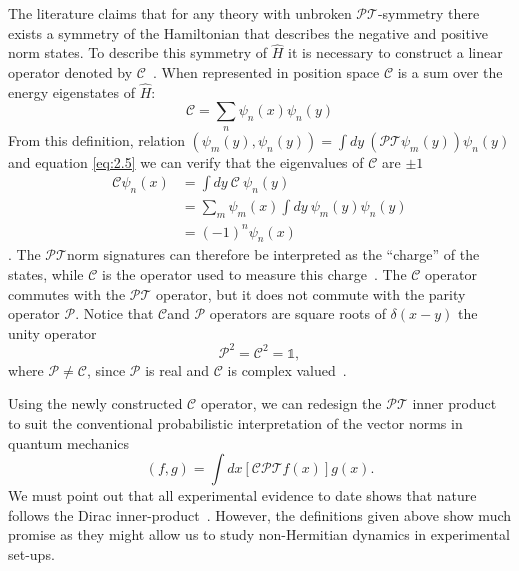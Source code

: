 \documentclass[12pt, a4paper]{report}
\newcommand\PT{\(\mathcal{PT}\)}
\newcommand\PP{\(\mathcal{P}\)}
\newcommand\CC{\(\mathcal{C}\)}
\begin{document}
The literature claims that for any theory with unbroken \PT-symmetry there exists a symmetry of the Hamiltonian that describes the negative and positive norm states. To describe this symmetry of $\hat{H}$ it is necessary to construct a linear operator denoted by \CC~\cite{MustaHbeHermitian,ComplexExtension,Bender_2004}. When represented in position space \CC\: is a sum over the energy eigenstates of $\hat{H}$:
\begin{equation}\label{eq:2.7}
\mathcal{C} = \sum_n \psi_n(x)\psi_n(y)
\end{equation}
From this definition, relation $(\psi_m(y), \psi_n(y)) = \int dy\:(\mathcal{PT}\psi_m(y))\psi_n(y)$ and equation \ref{eq:2.5} we can verify that the eigenvalues of \CC\: are $\pm 1$
\begin{align}\label{eq:2.8}
\mathcal{C} \psi_n(x) & = \int dy\:\mathcal{C}\:\psi_n(y)\nonumber \\
& = \sum_{m}\psi_m(x)\int dy\:\psi_m(y) \psi_n(y)\nonumber \\
& = (-1)^n \psi_n(x)
\end{align}.
The \PT\:norm signatures can therefore be interpreted as the ``charge'' of the states, while \CC\: is the operator used to measure this charge~\cite{Bender_2004}. The \CC\: operator commutes with the \PT\: operator, but it does not commute with the parity operator \PP. Notice that \CC\:and \PP\: operators are square roots of $\delta(x-y)$ the unity operator~\cite{ComplexExtension}
\begin{equation}\label{eq:2.9}
\mathcal{P}^2 = \mathcal{C}^2 = \mathds{1}, 
\end{equation}
where $\mathcal{P} \neq \mathcal{C}$, since \PP\: is real and \CC\: is complex valued~\cite{MustaHbeHermitian, Bender_2004}.

Using the newly constructed \CC\: operator, we can redesign the \PT\: inner product to suit the conventional probabilistic interpretation of the vector norms in quantum mechanics
\begin{equation}\label{eq:2.10}
\left( f, g \right ) = \int dx \left [ \mathcal{CPT} f(x) \right ] g(x).
\end{equation}
We must point out that all experimental evidence to date shows that nature follows the Dirac inner-product~\cite{Maximal}. However, the definitions given above show much promise as they might allow us to study non-Hermitian dynamics in experimental set-ups.

\end{document}
